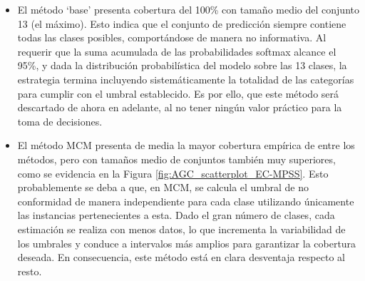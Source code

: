 \begin{itemize}

    \item El método `base' presenta cobertura del 100\% con tamaño medio del conjunto 13 (el máximo). Esto indica que el conjunto de predicción siempre contiene todas las clases posibles, comportándose de manera no informativa. Al requerir que la suma acumulada de las probabilidades softmax alcance el 95\%, y dada la distribución probabilística del modelo sobre las 13 clases, la estrategia termina incluyendo sistemáticamente la totalidad de las categorías para cumplir con el umbral establecido. Es por ello, que este método será descartado de ahora en adelante, al no tener ningún valor práctico para la toma de decisiones.
    
    \item El método MCM presenta de media la mayor cobertura empírica de entre los métodos, pero con tamaños medio de conjuntos también muy superiores, como se evidencia en la Figura \ref{fig:AGC_scatterplot_EC-MPSS}. Esto probablemente se deba a que, en MCM, se calcula el umbral de no conformidad de manera independiente para cada clase utilizando únicamente las instancias pertenecientes a esta. Dado el gran número de clases, cada estimación se realiza con menos datos, lo que incrementa la variabilidad de los umbrales y conduce a intervalos más amplios para garantizar la cobertura deseada. En consecuencia, este método está en clara desventaja respecto al resto. 

\end{itemize}

